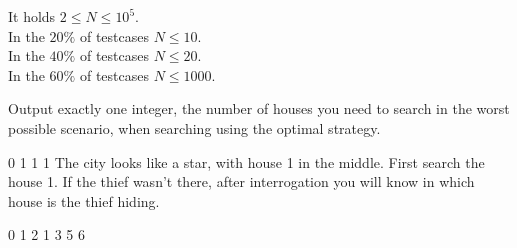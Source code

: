 \smallskip
\noindent
It holds $2 \leq N \leq 10^5$.\\
In the $20\%$ of testcases $N \leq 10$.\\
In the $40\%$ of testcases $N \leq 20$.\\
In the $60\%$ of testcases $N \leq 1000$.


Output exactly one integer, the number of houses you need to search in the worst possible scenario,
when searching using the optimal strategy.



0 1 1 1
\sampleCOMMENT
The city looks like a star, with house 1 in the middle.
\sampleCOMMENT
First search the house 1.
If the thief wasn't there, after interrogation you will know in which house is the thief hiding.
\sampleEND


\bigskip


0 1 2 1 3 5 6
\sampleEND


